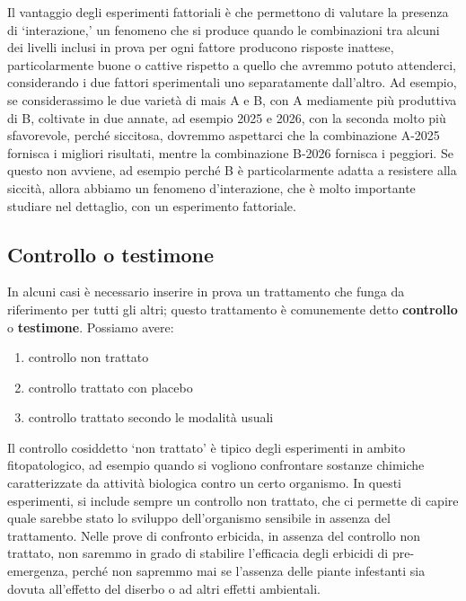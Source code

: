 \documentclass[a4paper,12pt,oneside]{book}
\providecommand{\tightlist}{%
  \setlength{\itemsep}{0pt}\setlength{\parskip}{0pt}}
\begin{document}
Il vantaggio degli esperimenti fattoriali è che permettono di valutare la presenza di `interazione,' un fenomeno che si produce quando le combinazioni tra alcuni dei livelli inclusi in prova per ogni fattore producono risposte inattese, particolarmente buone o cattive rispetto a quello che avremmo potuto attenderci, considerando i due fattori sperimentali uno separatamente dall'altro. Ad esempio, se considerassimo le due varietà di mais A e B, con A mediamente più produttiva di B, coltivate in due annate, ad esempio 2025 e 2026, con la seconda molto più sfavorevole, perché siccitosa, dovremmo aspettarci che la combinazione A-2025 fornisca i migliori risultati, mentre la combinazione B-2026 fornisca i peggiori. Se questo non avviene, ad esempio perché B è particolarmente adatta a resistere alla siccità, allora abbiamo un fenomeno d'interazione, che è molto importante studiare nel dettaglio, con un esperimento fattoriale.

\hypertarget{controllo-o-testimone}{%
\subsection{Controllo o testimone}\label{controllo-o-testimone}}

In alcuni casi è necessario inserire in prova un trattamento che funga da riferimento per tutti gli altri; questo trattamento è comunemente detto \textbf{controllo} o \textbf{testimone}. Possiamo avere:

\begin{enumerate}
\def\labelenumi{\arabic{enumi}.}
\tightlist
\item
  controllo non trattato
\item
  controllo trattato con placebo
\item
  controllo trattato secondo le modalità usuali
\end{enumerate}

Il controllo cosiddetto `non trattato' è tipico degli esperimenti in ambito fitopatologico, ad esempio quando si vogliono confrontare sostanze chimiche caratterizzate da attività biologica contro un certo organismo. In questi esperimenti, si include sempre un controllo non trattato, che ci permette di capire quale sarebbe stato lo sviluppo dell'organismo sensibile in assenza del trattamento. Nelle prove di confronto erbicida, in assenza del controllo non trattato, non saremmo in grado di stabilire l'efficacia degli erbicidi di pre-emergenza, perché non sapremmo mai se l'assenza delle piante infestanti sia dovuta all'effetto del diserbo o ad altri effetti ambientali.
\end{document}
